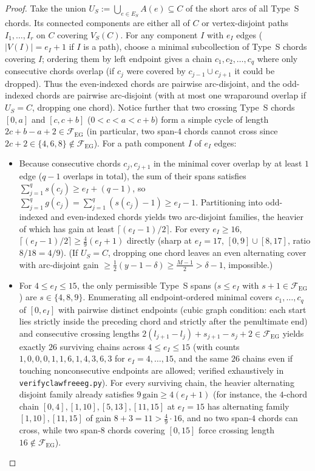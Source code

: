 \documentclass[11pt,reqno]{amsart}
\theoremstyle{plain}
\theoremstyle{definition}
\theoremstyle{remark}
\newcommand{\FEG}{\mathcal{F}_{\mathrm{EG}}}
\DeclareRobustCommand{\_}{\ifmmode\text{\textunderscore}\else\textunderscore\allowbreak\fi}
\begin{document}
\begin{proof}
Take the union $U_S := \bigcup_{e \in E_S} A(e) \subseteq C$ of the short arcs of all Type~S chords. Its connected components are either all of $C$ or vertex-disjoint paths $I_1, \dots, I_r$ on $C$ covering $V_S(C)$. For any component $I$ with $e_I$ edges ($|V(I)| = e_I + 1$ if $I$ is a path), choose a minimal subcollection of Type~S chords covering $I$; ordering them by left endpoint gives a chain $c_1, c_2, \dots, c_q$ where only consecutive chords overlap (if $c_j$ were covered by $c_{j-1} \cup c_{j+1}$ it could be dropped). Thus the even-indexed chords are pairwise arc-disjoint, and the odd-indexed chords are pairwise arc-disjoint (with at most one wraparound overlap if $U_S = C$, dropping one chord). Notice further that two crossing Type~S chords $[0, a]$ and $[c, c + b]$ ($0 < c < a < c + b$) form a simple cycle of length $2c + b - a + 2 \in \FEG$ (in particular, two span-$4$ chords cannot cross since $2c + 2 \in \{4, 6, 8\} \notin \FEG$). For a path component $I$ of $e_I$ edges:
\begin{itemize}[leftmargin=1.6em]
  \item Because consecutive chords $c_j, c_{j+1}$ in the minimal cover overlap by at least $1$ edge ($q - 1$ overlaps in total), the sum of their spans satisfies $\sum_{j=1}^q s(c_j) \ge e_I + (q - 1)$, so $\sum_{j=1}^q g(c_j) = \sum_{j=1}^q (s(c_j) - 1) \ge e_I - 1$. Partitioning into odd-indexed and even-indexed chords yields two arc-disjoint families, the heavier of which has gain at least $\lceil (e_I - 1)/2 \rceil$. For every $e_I \ge 16$, $\lceil (e_I - 1)/2 \rceil \ge \frac{4}{9}(e_I + 1)$ directly (sharp at $e_I = 17$, $[0, 9] \cup [8, 17]$, ratio $8/18 = 4/9$). (If $U_S = C$, dropping one chord leaves an even alternating cover with arc-disjoint gain $\ge \frac{1}{2}(y - 1 - \delta) \ge \frac{M - 1}{2} > \delta - 1$, impossible.)
  \item For $4 \le e_I \le 15$, the only permissible Type~S spans ($s \le e_I$ with $s + 1 \in \FEG$) are $s \in \{4, 8, 9\}$. Enumerating all endpoint-ordered minimal covers $c_1, \dots, c_q$ of $[0, e_I]$ with pairwise distinct endpoints (cubic graph condition: each start lies strictly inside the preceding chord and strictly after the penultimate end) and consecutive crossing lengths $2(l_{j+1} - l_j) + s_{j+1} - s_j + 2 \in \FEG$ yields exactly $26$ surviving chains across $4 \le e_I \le 15$ (with counts $1,0,0,0,1,1,6,1,4,3,6,3$ for $e_I = 4, \dots, 15$, and the same $26$ chains even if touching nonconsecutive endpoints are allowed; verified exhaustively in \texttt{verify\_clawfree\_eg.py}). For every surviving chain, the heavier alternating disjoint family already satisfies $9\,\mathrm{gain} \ge 4(e_I + 1)$ (for instance, the $4$-chord chain $[0, 4], [1, 10], [5, 13], [11, 15]$ at $e_I = 15$ has alternating family $[1, 10], [11, 15]$ of gain $8 + 3 = 11 > \frac{4}{9}\cdot 16$, and no two span-$4$ chords can cross, while two span-$8$ chords covering $[0, 15]$ force crossing length $16 \notin \FEG$).

\end{itemize}
\end{proof}
\end{document}
